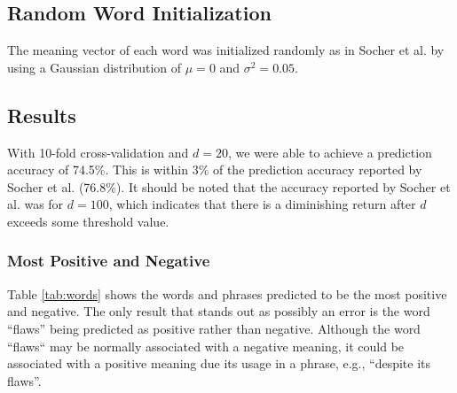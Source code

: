 \documentclass{article}
\begin{document}
%
%
\subsection{Random Word Initialization}
The meaning vector of each word was initialized randomly as in Socher et al. by using a Gaussian distribution of $\mu = 0$ and $\sigma ^2 = 0.05$.


%
%
\subsection{Results}
With 10-fold cross-validation and $d=20$, we were able to achieve a prediction accuracy of 74.5\%. This is within 3\% of the prediction accuracy reported by Socher et al. (76.8\%). It should be noted that the accuracy reported by Socher et al. was for $d=100$, which indicates that there is a diminishing return after $d$ exceeds some threshold value.


\subsubsection{Most Positive and Negative}
Table \ref{tab:words} shows the words and phrases predicted to be the most positive and negative. The only result that stands out as possibly an error is the word ``flaws'' being predicted as positive rather than negative. Although the word ``flaws`` may be normally associated with a negative meaning, it could be associated with a positive meaning due its usage in a phrase, e.g., ``despite its flaws''.
\end{document}
